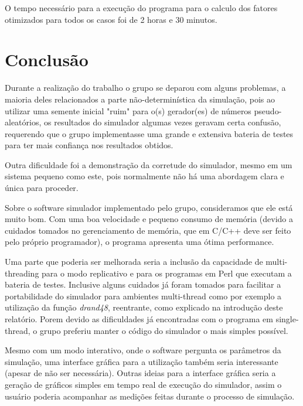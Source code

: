 \documentclass[a4paper,10pt]{article}
\begin{document}
O tempo necessário para a execução do programa para o calculo dos fatores otimizados para todos os casos foi de 2 horas e 30 minutos.

\pagebreak

\section{Conclusão}

Durante a realização do trabalho o grupo se deparou com alguns problemas, a maioria deles relacionados a parte não-determinística da simulação, pois ao utilizar uma semente inicial "ruim" para o(s) gerador(es) de números pseudo-aleatórios, os resultados do simulador algumas vezes geravam certa confusão, requerendo que o grupo implementasse uma grande e extensiva bateria de testes para ter mais confiança nos resultados obtidos.

Outra dificuldade foi a demonstração da corretude do simulador, mesmo em um sistema pequeno como este, pois normalmente não há uma abordagem clara e única para proceder.

Sobre o software simulador implementado pelo grupo, consideramos que ele está muito bom. Com uma boa velocidade e pequeno consumo de memória (devido a cuidados tomados no gerenciamento de memória, que em C/C++ deve ser feito pelo próprio programador), o programa apresenta uma ótima performance.

Uma parte que poderia ser melhorada seria a inclusão da capacidade de multi-threading para o modo replicativo e para os programas em Perl que executam a bateria de testes. Inclusive alguns cuidados já foram tomados para facilitar a portabilidade do simulador para ambientes multi-thread como por exemplo a utilização da função \emph{drand48}, reentrante, como explicado na introdução deste relatório. Porem devido as dificuldades já encontradas com o programa em single-thread, o grupo preferiu manter o código do simulador o mais simples possível.

Mesmo com um modo interativo, onde o software pergunta os parâmetros da simulação, uma interface gráfica para a utilização também seria interessante (apesar de não ser necessária). Outras ideias para a interface gráfica seria a geração de gráficos simples em tempo real de execução do simulador, assim o usuário poderia acompanhar as medições feitas durante o processo de simulação.

\pagebreak
\end{document}
